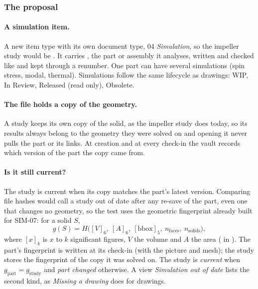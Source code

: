 \subsubsection*{The proposal}

\paragraph{A simulation item.} A new item type  with its own document type, 04 \emph{Simulation}, so
the impeller study would be . It carries , the part or assembly it analyses,
written and checked like  and kept through a renumber. One part can have several simulations
(spin stress, modal, thermal). Simulations follow the same lifecycle as drawings: WIP, In Review, Released (read only),
Obsolete.

\paragraph{The file holds a copy of the geometry.} A study keeps its own copy of the solid, as the impeller study does
today, so its results always belong to the geometry they were solved on and opening it never pulls the part or its
links. At creation and at every check-in the vault records which version of the part the copy came from.

\paragraph{Is it still current?} The study is current when its copy matches the part's latest version. Comparing file
hashes would call a study out of date after any re-save of the part, even one that changes no geometry, so the test uses
the geometric fingerprint already built for SIM-07: for a solid $S$,
\[
  g(S)=H\bigl([V]_6,\ [A]_6,\ [\text{bbox}]_5,\ n_\text{faces},\ n_\text{solids}\bigr),
\]
where $[x]_k$ is $x$ to $k$ significant figures, $V$ the volume and $A$ the area ( in
). The part's fingerprint is written at
its check-in (with the picture and mesh); the study stores the fingerprint of the copy it was solved on. The study is
\emph{current} when $g_\text{part}=g_\text{study}$ and \emph{part changed} otherwise. A view \emph{Simulation out of
date} lists the second kind, as \emph{Missing a drawing} does for drawings.

